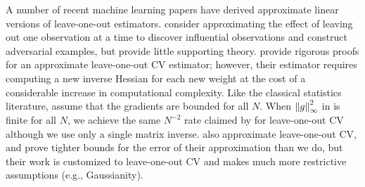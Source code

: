 A number of recent machine learning papers have derived approximate linear
versions of leave-one-out estimators.  \citet{KohL17} consider approximating the
effect of leaving out one observation at a time to discover influential
observations and construct adversarial examples, but provide little supporting
theory. \citet{BeiramiRST17} provide rigorous proofs for an approximate
leave-one-out CV estimator; however, their estimator requires computing a new
inverse Hessian for each new weight at the cost of a considerable increase in
computational complexity.  Like the classical statistics literature,
\citet{BeiramiRST17} assume that the gradients are bounded for all $N$.  When
$\left\Vert g\right\Vert_{\infty}^2$ in  is finite for all
$N$, we achieve the same $N^{-2}$ rate claimed by \citet{BeiramiRST17} for
leave-one-out CV although we use only a single matrix inverse. \citet{RadM18}
also approximate leave-one-out CV, and prove tighter bounds for the error of
their approximation than we do, but their work is customized to leave-one-out CV
and makes much more restrictive assumptions (e.g., Gaussianity).
